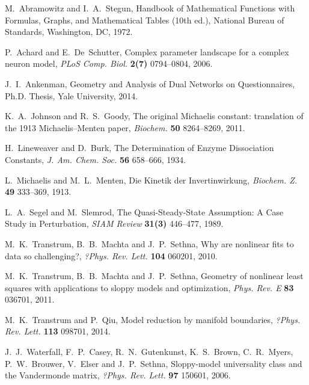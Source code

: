 \documentclass{article}
\begin{document}
\begin{thebibliography}{99}
%

M.~Abramowitz and I.~A.~Stegun,
Handbook of Mathematical Functions
with Formulas, Graphs, and Mathematical Tables (10th ed.),
National Bureau of Standards, Washington, DC, 1972.

P.~Achard and E.~De~Schutter,
Complex parameter landscape for a complex neuron model,
{\it PLoS Comp. Biol.} \textbf{2(7)} 0794--0804, 2006.

J.~I.~Ankenman,
Geometry and Analysis of Dual Networks on Questionnaires,
Ph.D. Thesis, Yale University, 2014.

K.~A.~Johnson and R.~S.~Goody,
The original Michaelis constant:
translation of the 1913 Michaelis--Menten paper,
{\it Biochem.} \textbf{50} 8264--8269, 2011.

H.~Lineweaver and D.~Burk,
The Determination of Enzyme Dissociation Constants,
{\it J. Am. Chem. Soc.} \textbf{56} 658--666, 1934.

L.~Michaelis and M.~L.~Menten,
Die Kinetik der Invertinwirkung,
{\it Biochem. Z.} \textbf{49} 333--369, 1913.

L.~A.~Segel and M.~Slemrod,
The Quasi-Steady-State Assumption:
A Case Study in Perturbation,
{\it SIAM Review} \textbf{31(3)} 446--477, 1989.

M.~K.~Transtrum, B.~B.~Machta and J.~P.~Sethna,
Why are nonlinear fits to data so challenging?,
{\it ?Phys. Rev. Lett.} \textbf{104} 060201, 2010.

M.~K.~Transtrum, B.~B.~Machta and J.~P.~Sethna,
Geometry of nonlinear least squares
with applications to sloppy models and optimization,
{\it Phys. Rev. E} \textbf{83} 036701, 2011.

M.~K.~Transtrum and P.~Qiu,
Model reduction by manifold boundaries,
{\it ?Phys. Rev. Lett.} \textbf{113} 098701, 2014.

J.~J.~Waterfall, F.~P.~Casey, R.~N.~Gutenkunst, K.~S.~Brown, C.~R.~Myers,
P.~W.~Brouwer, V.~Elser and J.~P.~Sethna,
Sloppy-model universality class and the Vandermonde matrix,
{\it ?Phys. Rev. Lett.} \textbf{97} 150601, 2006.

\end{thebibliography}
\end{document}
